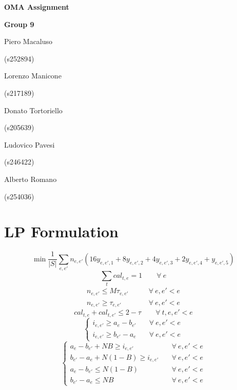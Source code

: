 \documentclass[11pt, a4paper, leqno]{article}
\newcommand{\nome}[2]{
\begin{minipage}[t]{0.185\linewidth}
	\centering #1\par
	\centering\small (#2)\par
\end{minipage}
}
\begin{document}
	
	\begin{center}
		{\huge\textbf{OMA Assignment}}\par
		\vspace{0.3em}
		{\large\textbf{Group 9}}\par
		\vspace{1em}
		\nome{Piero Macaluso}{s252894}
		\nome{Lorenzo Manicone}{s217189}
		\nome{Donato Tortoriello}{s205639}
		\nome{Ludovico Pavesi}{s246422}
		\nome{Alberto Romano}{s254036} %
	\end{center}

	\section{LP Formulation}

	\begin{equation}
		\tag{Objective function}
		\label{of}
		\min\frac{1}{\left|S\right|
		}\sum_{e,e'} n_{e,e'}\left(16y_{e,e',1}+8y_{e,e',2}+4y_{e,e',3}+2y_{e,e',4}+y_{e,e',5}\right)
	\end{equation}
	\begin{equation}
		\label{apply}
		\sum_{t} cal_{t,e} = 1 \qquad\forall\ e
	\end{equation}
	\begin{equation}
	\label{conflict1}
	\begin{aligned}
	n_{e,e'} \leq M\tau_{e,e'} &\qquad \forall\ e,e'<e \\
	n_{e,e'} \geq \tau_{e,e'} &\qquad \forall\ e,e'<e
	\end{aligned}
	\end{equation}
	\begin{equation}
	\label{conflict2}
	cal_{t,e}+cal_{t,e'} \leq 2 - \tau \qquad \forall\ t,e,e'<e
	\end{equation}
	\begin{equation}
	\label{distance1}
	\begin{cases}
	i_{e,e'} \geq a_e-b_{e'}&\quad \forall\ e,e'<e\\
	i_{e,e'} \geq b_{e'}-a_e&\quad \forall\ e,e'<e
	\end{cases}
	\end{equation}
	\begin{equation}
	\begin{cases}
	\label{distance2}
	a_e-b_{e'} + NB \geq i_{e,e'}&\quad \forall\ e,e'<e\\
	b_{e'}-a_e + N(1-B) \geq i_{e,e'}&\quad \forall\ e,e'<e\\
	a_e-b_{e'} \leq N(1-B)&\quad \forall\ e,e'<e\\
	b_{e'}-a_e \leq NB&\quad \forall\ e,e'<e
	\end{cases}
	\end{equation}
\end{document}
